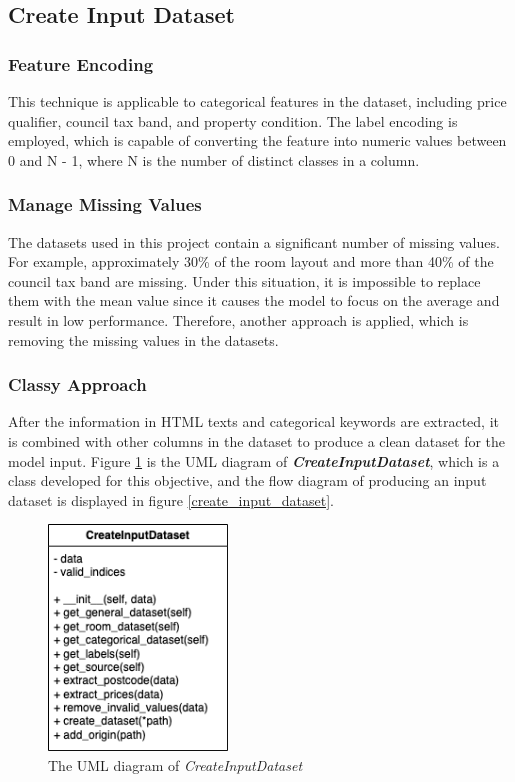 \documentclass[12pt,twoside]{report}
\begin{document}
\subsection{Create Input Dataset}
\label{create_input_dataset_section}
\subsubsection{Feature Encoding}
This technique is applicable to categorical features in the dataset, including price qualifier, council tax band, and property condition. The label encoding is employed, which is capable of converting the feature into numeric values between 0 and N - 1, where N is the number of distinct classes in a column.

\subsubsection{Manage Missing Values}
The datasets used in this project contain a significant number of missing values. For example, approximately 30\% of the room layout and more than 40\% of the council tax band are missing. Under this situation, it is impossible to replace them with the mean value since it causes the model to focus on the average and result in low performance. Therefore, another approach is applied, which is removing the missing values in the datasets. 

\subsubsection{Classy Approach}
After the information in HTML texts and categorical keywords are extracted, it is combined with other columns in the dataset to produce a clean dataset for the model input.  Figure \ref{uml_create_input_dataset} is the UML diagram of \textit{\textbf{CreateInputDataset}}, which is a class developed for this objective, and the flow diagram of producing an input dataset is displayed in figure \ref{create_input_dataset}.

\begin{figure}[!htbp]
	\centering
	\includegraphics[height=6cm]{uml_create_input_dataset}
	\caption{The UML diagram of \textit{CreateInputDataset}}
	\label{uml_create_input_dataset}
\end{figure}
\end{document}
